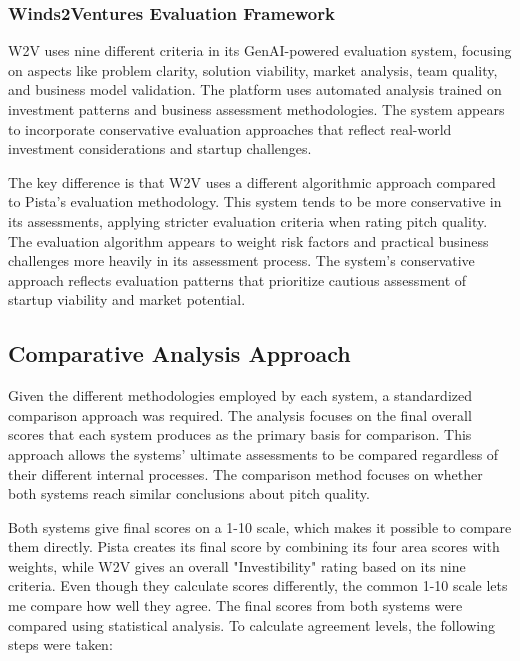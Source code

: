 \subsubsection{Winds2Ventures Evaluation Framework}

W2V uses nine different criteria in its GenAI-powered evaluation system, focusing on aspects like problem clarity, solution viability, market analysis, team quality, and business model validation. The platform uses automated analysis trained on investment patterns and business assessment methodologies. The system appears to incorporate conservative evaluation approaches that reflect real-world investment considerations and startup challenges.

The key difference is that W2V uses a different algorithmic approach compared to Pista's evaluation methodology. This system tends to be more conservative in its assessments, applying stricter evaluation criteria when rating pitch quality. The evaluation algorithm appears to weight risk factors and practical business challenges more heavily in its assessment process. The system's conservative approach reflects evaluation patterns that prioritize cautious assessment of startup viability and market potential.

\subsection{Comparative Analysis Approach}
\label{subsec:methodology-approach}

Given the different methodologies employed by each system, a standardized comparison approach was required. The analysis focuses on the final overall scores that each system produces as the primary basis for comparison. This approach allows the systems' ultimate assessments to be compared regardless of their different internal processes. The comparison method focuses on whether both systems reach similar conclusions about pitch quality.

Both systems give final scores on a 1-10 scale, which makes it possible to compare them directly. Pista creates its final score by combining its four area scores with weights, while W2V gives an overall "Investibility" rating based on its nine criteria. Even though they calculate scores differently, the common 1-10 scale lets me compare how well they agree.
The final scores from both systems were compared using statistical analysis. 
To calculate agreement levels, the following steps were taken:

